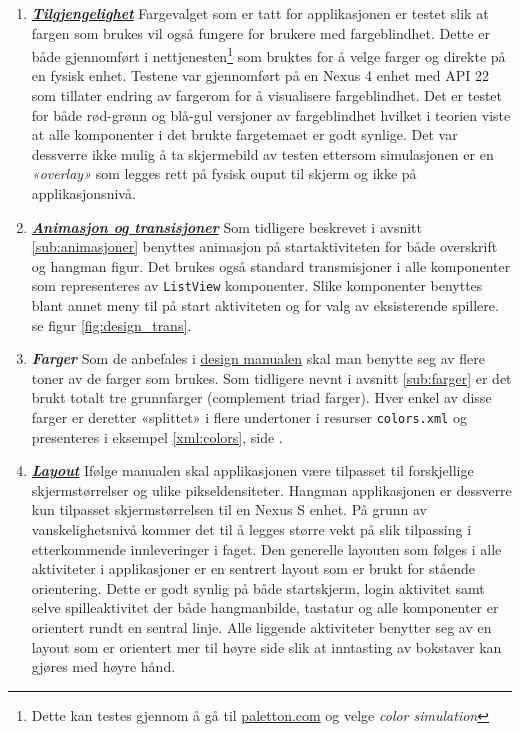 \begin{enumerate}
\item \textbf{\textsl{\href{https://www.google.com/design/spec/usability/accessibility.html}{Tilgjengelighet}}}
Fargevalget som er tatt for applikasjonen er testet slik at fargen som brukes vil også fungere for brukere med fargeblindhet. Dette er både gjennomført i nettjenesten\footnote{Dette kan testes gjennom å gå til \href{http://paletton.com/\#uid=3470u0krausgVEBm0wFuzpjybk1}{paletton.com} og velge \textit{color simulation}} som bruktes for å velge farger og direkte på en fysisk enhet. Testene var gjennomført på en Nexus 4 enhet med API 22 som tillater endring av fargerom for å visualisere fargeblindhet. Det er testet for både rød-grønn og blå-gul versjoner av fargeblindhet hvilket i teorien viste at alle komponenter i det brukte fargetemaet er godt synlige. Det var dessverre ikke mulig å ta skjermebild av testen ettersom simulasjonen er en \textit{«overlay»} som legges rett på fysisk ouput til skjerm og ikke på applikasjonsnivå. 

\item \textbf{\textsl{\href{https://www.google.com/design/spec/animation/authentic-motion.html}{Animasjon og transisjoner}}}
Som tidligere beskrevet i avsnitt \ref{sub:animasjoner} benyttes animasjon på startaktiviteten for både overskrift og hangman figur. Det brukes også standard transmisjoner i alle komponenter som representeres av \texttt{ListView} komponenter. Slike komponenter benyttes blant annet meny til på start aktiviteten og for valg av eksisterende spillere. se figur \ref{fig:design_trans}.


\item \textbf{\textsl{Farger}}
Som de anbefales i \href{https://www.google.com/design/spec/style/color.html}{design manualen} skal man benytte seg av flere toner av de farger som brukes. Som tidligere nevnt i avsnitt \ref{sub:farger} er det brukt totalt tre grunnfarger (complement triad farger). Hver enkel av disse farger er deretter «splittet» i flere undertoner i resurser \texttt{colors.xml} og presenteres i eksempel \ref{xml:colors}, side \pageref{xml:colors}.

\item \textbf{\textsl{\href{https://www.google.com/design/spec/layout/principles.html}{Layout}}}
Ifølge manualen skal applikasjonen være tilpasset til forskjellige skjermstørrelser og ulike pikseldensiteter. Hangman applikasjonen er dessverre kun tilpasset skjermstørrelsen til en Nexus S enhet. På grunn av vanskelighetsnivå kommer det til å legges større vekt på slik tilpassing i etterkommende innleveringer i faget. 
Den generelle layouten som følges i alle aktiviteter i applikasjoner er en sentrert layout som er brukt for stående orientering. Dette er godt synlig på både startskjerm, login aktivitet samt selve spilleaktivitet der både hangmanbilde, tastatur og alle komponenter er orientert rundt en sentral linje. Alle liggende aktiviteter benytter seg av en layout som er orientert mer til høyre side slik at inntasting av bokstaver kan gjøres med høyre hånd.


\end{enumerate}

